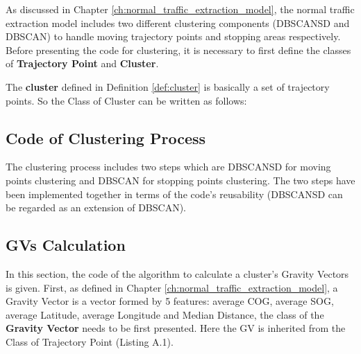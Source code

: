 \documentclass[12pt,glossary]{dalcsthesis}
\begin{document}
As discussed in Chapter \ref{ch:normal_traffic_extraction_model}, the normal traffic extraction model includes two different clustering components (DBSCANSD and DBSCAN) to handle moving trajectory points and stopping areas respectively. Before presenting the code for clustering, it is necessary to first define the classes of \textbf{Trajectory Point} and \textbf{Cluster}.



The \textbf{cluster} defined in Definition \ref{def:cluster} is basically a set of trajectory points. So the Class of Cluster can be written as follows:



\subsection{Code of Clustering Process}


The clustering process includes two steps which are DBSCANSD for moving points clustering and DBSCAN for stopping points clustering. The two steps have been implemented together in terms of the code's reusability (DBSCANSD can be regarded as an extension of DBSCAN). 




\subsection{GVs Calculation}

In this section, the code of the algorithm to calculate a cluster's Gravity Vectors is given. First, as defined in Chapter \ref{ch:normal_traffic_extraction_model}, a Gravity Vector is a vector formed by 5 features: average COG, average SOG, average Latitude, average Longitude and Median Distance, the class of the \textbf{Gravity Vector} needs to be first presented. Here the GV is inherited from the Class of Trajectory Point  (Listing A.1). 
\end{document}
